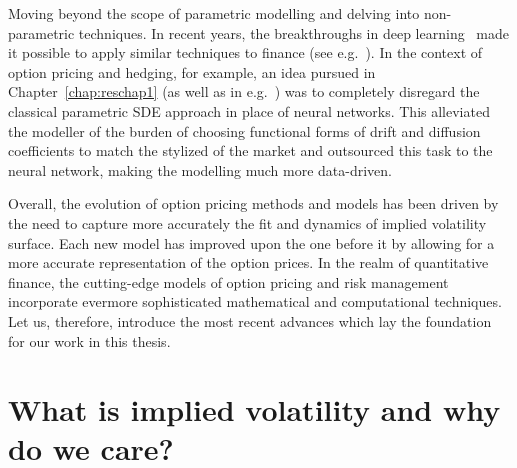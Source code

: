 Moving beyond the scope of parametric modelling and delving into non-parametric techniques. In recent years, the breakthroughs in deep learning~\cite{Goodfellow2016DeepLearning} made it possible to apply similar techniques to finance (see e.g.~\cite{Buehler2019DeepHedging, Ruf2020NeuralReview, Heaton2017DeepPortfolios, Horvath2020DeepModels}). %
In the context of option pricing and hedging, for example, an idea pursued in  Chapter~\ref{chap:reschap1} (as well as in e.g.~\cite{Cuchiero2020AModels}) was to completely disregard the classical parametric SDE approach in place of neural networks. This alleviated the modeller of the burden of choosing functional forms of drift and diffusion coefficients to match the stylized of the market and outsourced this task to the neural network, making the modelling much more data-driven.

Overall, the evolution of option pricing methods and models has been driven by the need to capture more accurately the fit and dynamics of implied volatility surface. Each new model has improved upon the one before it by allowing for a more accurate representation of the option prices. In the realm of quantitative finance, the cutting-edge models of option pricing and risk management incorporate evermore sophisticated mathematical and computational techniques. Let us, therefore, introduce the most recent advances which lay the foundation for our work in this thesis.

\section{What is implied volatility and why do we care?}

